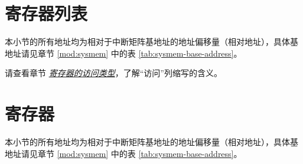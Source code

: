 \documentclass[main\_\_CN.tex]{subfiles}
\begin{document}
\hypertarget{intmtrx-reg-summ}{}
\section{寄存器列表}
\label{sec:intmtrx-reg-summ}

本小节的所有地址均为相对于中断矩阵基地址的地址偏移量（相对地址），具体基地址请见章节 \ref{mod:sysmem} \textit{} 中的表 \ref{tab:sysmem-base-address}。

请查看章节 \hyperref[glossary-access-types]{\textit{寄存器的访问类型}}，了解“访问”列缩写的含义。






\clearpage
\section{寄存器}

本小节的所有地址均为相对于中断矩阵基地址的地址偏移量（相对地址），具体基地址请见章节 \ref{mod:sysmem} \textit{} 中的表 \ref{tab:sysmem-base-address}。


\end{document}
